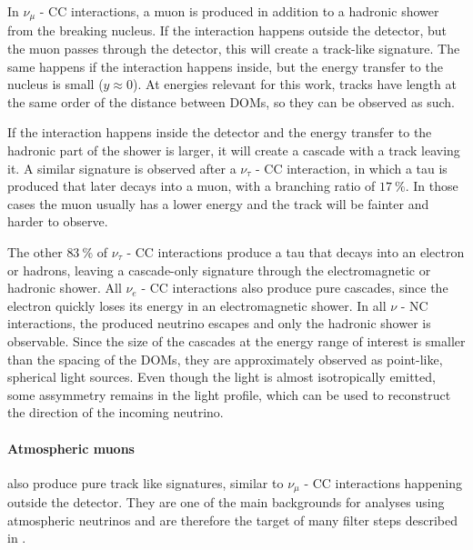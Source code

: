 In $\nu_\mu$ - CC interactions, a muon is produced in addition to a hadronic shower from the breaking nucleus. If the interaction happens outside the detector, but the muon passes through the detector, this will create a track-like signature. The same happens if the interaction happens inside, but the energy transfer to the nucleus is small ($y \approx 0$). At energies relevant for this work, tracks have length at the same order of the distance between DOMs, so they can be observed as such.

If the interaction happens inside the detector and the energy transfer to the hadronic part of the shower is larger, it will create a cascade with a track leaving it. A similar signature is observed after a $\nu_\tau$ - CC interaction, in which a tau is produced that later decays into a muon, with a branching ratio of $\SI{17}{\percent}$.
In those cases the muon usually has a lower energy and the track will be fainter and harder to observe.

The other $\SI{83}{\percent}$ of $\nu_\tau$ - CC interactions produce a tau that decays into an electron or hadrons, leaving a cascade-only signature through the electromagnetic or hadronic shower. All $\nu_e$ - CC interactions also produce pure cascades, since the electron quickly loses its energy in an electromagnetic shower. In all $\nu$ - NC interactions, the produced neutrino escapes and only the hadronic shower is observable. Since the size of the cascades at the energy range of interest is smaller than the spacing of the DOMs, they are approximately observed as point-like, spherical light sources. Even though the light is almost isotropically emitted, some assymmetry remains in the light profile, which can be used to reconstruct the direction of the incoming neutrino.


\paragraph{Atmospheric muons} also produce pure track like signatures, similar to $\nu_\mu$ - CC interactions happening outside the detector. They are one of the main backgrounds for analyses using atmospheric neutrinos and are therefore the target of many filter steps described in .

